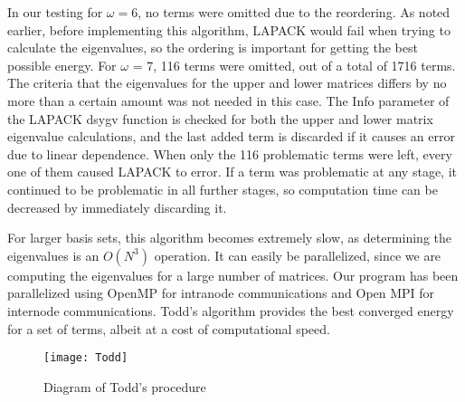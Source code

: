 \documentclass[Dissertation.tex]{subfiles}
\begin{document}
In our testing for $\omega = 6$, no terms were omitted due to the reordering. As noted earlier, before implementing this algorithm, LAPACK would fail when trying to calculate the eigenvalues, so the ordering is important for getting the best possible energy. For $\omega$ = 7, 116 terms were omitted, out of a total of 1716 terms. The criteria that the eigenvalues for the upper and lower matrices differs by no more than a certain amount was not needed in this case. The Info parameter of the LAPACK dsygv function is checked for both the upper and lower matrix eigenvalue calculations, and the last added term is discarded if it causes an error due to linear dependence. When only the 116 problematic terms were left, every one of them caused LAPACK to error. If a term was problematic at any stage, it continued to be problematic in all further stages, so computation time can be decreased by immediately discarding it.

For larger basis sets, this algorithm becomes extremely slow, as determining the eigenvalues is an $O(N^3)$ operation. It can easily be parallelized, since we are computing the eigenvalues for a large number of matrices. Our program has been parallelized using OpenMP for intranode communications and Open MPI for internode communications. Todd's algorithm provides the best converged energy for a set of terms, albeit at a cost of computational speed.

\begin{figure}[H]
	\centering
	{\texttt{[image: Todd]}}
	\caption{Diagram of Todd's procedure}
	\label{fig:Todd}
\end{figure}
\end{document}
